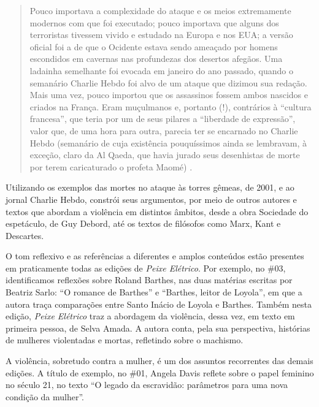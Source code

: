 \documentclass[portuguese]{textolivre}
\begin{document}
\begin{quote}
    Pouco importava a complexidade do ataque e os meios extremamente modernos com que foi executado; pouco importava que alguns dos terroristas tivessem vivido e estudado na Europa e nos EUA; a versão oficial foi a de que o Ocidente estava sendo ameaçado por homens escondidos em cavernas nas profundezas dos desertos afegãos. Uma ladainha semelhante foi evocada em janeiro do ano passado, quando o semanário Charlie Hebdo foi alvo de um ataque que dizimou sua redação. Mais uma vez, pouco importou que os assassinos fossem ambos nascidos e criados na França. Eram muçulmanos e, portanto (!), contrários à “cultura francesa”, que teria por um de seus pilares a “liberdade de expressão”, valor que, de uma hora para outra, parecia ter se encarnado no Charlie Hebdo (semanário de cuja existência pouquíssimos ainda se lembravam, à exceção, claro da Al Qaeda, que havia jurado seus desenhistas de morte por terem caricaturado o profeta Maomé) \cite[n.04, s/p, grifos nossos]{zacarias2016terror}.
\end{quote}

Utilizando os exemplos das mortes no ataque às torres gêmeas, de 2001, e ao jornal Charlie Hebdo, \textcite[n. 04]{zacarias2016terror} constrói seus argumentos, por meio de outros autores e textos que abordam a violência em distintos âmbitos, desde a obra Sociedade do espetáculo, de Guy Debord, até os textos de filósofos como Marx, Kant e Descartes.

O tom reflexivo e as referências a diferentes e amplos conteúdos estão presentes em praticamente todas as edições de \textit{Peixe Elétrico}. Por exemplo, no \#03, identificamos reflexões sobre Roland Barthes, nas duas matérias escritas por Beatriz Sarlo: “O romance de Barthes” e “Barthes, leitor de Loyola”, em que a autora traça comparações entre Santo Inácio de Loyola e Barthes. Também nesta edição, \textit{Peixe Elétrico} traz a abordagem da violência, dessa vez, em texto em primeira pessoa, de Selva Amada. A autora conta, pela sua perspectiva, histórias de mulheres violentadas e mortas, refletindo sobre o machismo.

A violência, sobretudo contra a mulher, é um dos assuntos recorrentes das demais edições. A título de exemplo, no \#01, Angela Davis reflete sobre o papel feminino no século 21, no texto “O legado da escravidão: parâmetros para uma nova condição da mulher”.
\end{document}
